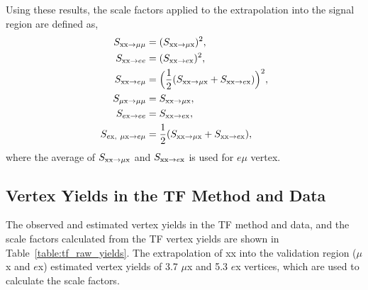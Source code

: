 Using these results, the scale factors applied to the extrapolation into the signal region are defined as,
\begin{align}
\label{eq:TF_scale_factors}
S_{\mathrm{xx}\rightarrow \mu\mu}  &=  (S_{\mathrm{xx}\rightarrow \mu \mathrm{x}} )^{2},  \nonumber\\
S_{\mathrm{xx}\rightarrow ee}  &= (S_{\mathrm{xx}\rightarrow e \mathrm{x}} )^{2},  \nonumber\\
S_{\mathrm{xx}\rightarrow e\mu}  &= \Big(\frac{1}{2} (S_{\mathrm{xx}\rightarrow \mu \mathrm{x}}  + S_{\mathrm{xx}\rightarrow e \mathrm{x}} )\Big)^{2}, \nonumber\\
S_{\mu \mathrm{x}\rightarrow \mu\mu}  &=  S_{\mathrm{xx}\rightarrow \mu \mathrm{x}} ,  \nonumber\\
S_{e \mathrm{x}\rightarrow ee}  &= S_{\mathrm{xx}\rightarrow e \mathrm{x}} ,  \nonumber\\
S_{e \mathrm{x},~\mu \mathrm{x} \rightarrow e\mu}  &= \frac{1}{2} (S_{\mathrm{xx}\rightarrow \mu \mathrm{x}}  + S_{\mathrm{xx}\rightarrow e \mathrm{x}} ),
\end{align}
where the average of $S_{\mathrm{xx}\rightarrow \mu \mathrm{x}} $ and $S_{\mathrm{xx}\rightarrow e \mathrm{x}} $ is used for $e \mu$ vertex.



\subsection{Vertex Yields in the TF Method and Data}
\label{sec:tf_raw_yields}
The observed and estimated vertex yields in the TF method and data, and the scale factors calculated from the TF vertex yields are shown in Table~\ref{table:tf_raw_yields}. The extrapolation of xx into the validation region ($\mu$x and $e$x) estimated vertex yields of 3.7 $\mu$x and 5.3 $e$x vertices, which are used to calculate the scale factors.

\begin{table}[!htb]%
  \centering
  \qquad
  \caption{(a) Vertex yields in the TF and data. (b) The scale factors calculated from the vetex yields}
  \label{table:tf_raw_yields}
\end{table}


